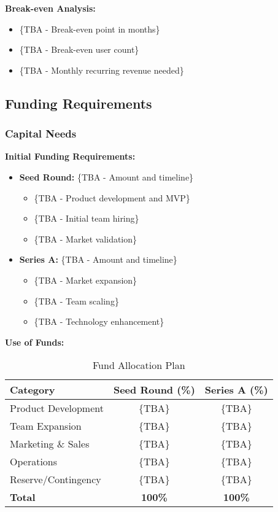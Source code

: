 \textbf{Break-even Analysis:}
\begin{itemize}
    \item \{TBA - Break-even point in months\}
    \item \{TBA - Break-even user count\}
    \item \{TBA - Monthly recurring revenue needed\}
\end{itemize}

\subsection{Funding Requirements}
\subsubsection{Capital Needs}
\textbf{Initial Funding Requirements:}
\begin{itemize}
    \item \textbf{Seed Round:} \{TBA - Amount and timeline\}
    \begin{itemize}
        \item \{TBA - Product development and MVP\}
        \item \{TBA - Initial team hiring\}
        \item \{TBA - Market validation\}
    \end{itemize}
    \item \textbf{Series A:} \{TBA - Amount and timeline\}
    \begin{itemize}
        \item \{TBA - Market expansion\}
        \item \{TBA - Team scaling\}
        \item \{TBA - Technology enhancement\}
    \end{itemize}
\end{itemize}

\textbf{Use of Funds:}
\begin{table}[h]
\centering
\begin{tabular}{|l|c|c|}
\hline
\textbf{Category} & \textbf{Seed Round (\%)} & \textbf{Series A (\%)} \\
\hline
Product Development & \{TBA\} & \{TBA\} \\
Team Expansion & \{TBA\} & \{TBA\} \\
Marketing \& Sales & \{TBA\} & \{TBA\} \\
Operations & \{TBA\} & \{TBA\} \\
Reserve/Contingency & \{TBA\} & \{TBA\} \\
\hline
\textbf{Total} & \textbf{100\%} & \textbf{100\%} \\
\hline
\end{tabular}
\caption{Fund Allocation Plan}
\end{table}

